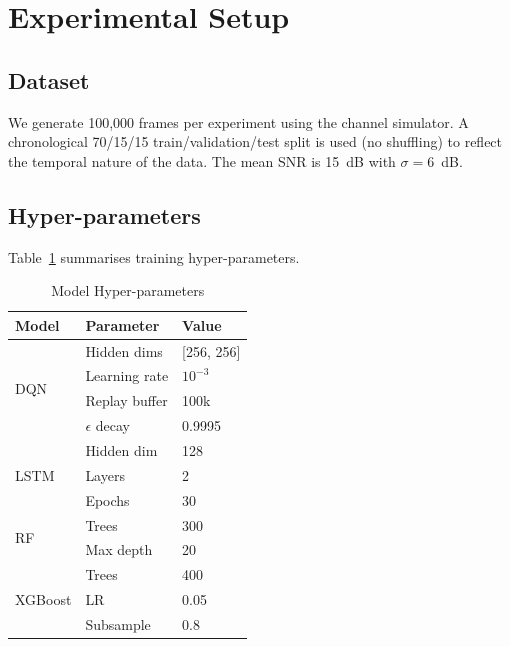 \documentclass[conference]{IEEEtran}
\begin{document}
\section{Experimental Setup}

\subsection{Dataset}

We generate 100,000 frames per experiment using the channel simulator.
A chronological 70/15/15 train/validation/test split is used (no shuffling)
to reflect the temporal nature of the data. The mean SNR is 15~dB with
$\sigma = 6$~dB.

\subsection{Hyper-parameters}

Table~\ref{tab:hyperparams} summarises training hyper-parameters.

\begin{table}[h]
  \caption{Model Hyper-parameters}
  \label{tab:hyperparams}
  \centering
  \begin{tabular}{lll}
    \toprule
    Model & Parameter & Value \\
    \midrule
    \multirow{4}{*}{DQN}
      & Hidden dims     & [256, 256] \\
      & Learning rate   & $10^{-3}$ \\
      & Replay buffer   & 100k \\
      & $\epsilon$ decay & 0.9995 \\
    \midrule
    \multirow{3}{*}{LSTM}
      & Hidden dim      & 128 \\
      & Layers          & 2 \\
      & Epochs          & 30 \\
    \midrule
    \multirow{2}{*}{RF}
      & Trees           & 300 \\
      & Max depth       & 20 \\
    \midrule
    \multirow{3}{*}{XGBoost}
      & Trees           & 400 \\
      & LR              & 0.05 \\
      & Subsample       & 0.8 \\
    \bottomrule
  \end{tabular}
\end{table}
\end{document}
